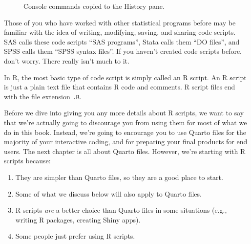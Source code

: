 \documentclass[
  letterpaper,
  DIV=11,
  numbers=noendperiod]{scrreprt}
\providecommand{\tightlist}{%
  \setlength{\itemsep}{0pt}\setlength{\parskip}{0pt}}\usepackage{longtable,booktabs,array}
\begin{document}
\begin{figure}


\caption{\label{fig-history}Console commands copied to the History
pane.}

\end{figure}%

Those of you who have worked with other statistical programs before may
be familiar with the idea of writing, modifying, saving, and sharing
code scripts. SAS calls these code scripts ``SAS programs'', Stata calls
them ``DO files'', and SPSS calls them ``SPSS syntax files''. If you
haven't created code scripts before, don't worry. There really isn't
much to it.

In R, the most basic type of code script is simply called an R script.
An R script is just a plain text file that contains R code and comments.
R script files end with the file extension \texttt{.R}.

Before we dive into giving you any more details about R scripts, we want
to say that we're actually going to discourage you from using them for
most of what we do in this book. Instead, we're going to encourage you
to use Quarto files for the majority of your interactive coding, and for
preparing your final products for end users. The next chapter is all
about Quarto files. However, we're starting with R scripts because:

\begin{enumerate}
\def\labelenumi{\arabic{enumi}.}
\tightlist
\item
  They are simpler than Quarto files, so they are a good place to
  start.\\
\item
  Some of what we discuss below will also apply to Quarto files.\\
\item
  R scripts \emph{are} a better choice than Quarto files in some
  situations (e.g., writing R packages, creating Shiny apps).\\
\item
  Some people just prefer using R scripts.
\end{enumerate}
\end{document}
